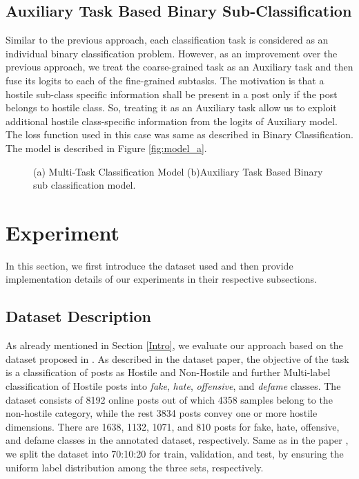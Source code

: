 \documentclass[runningheads]{llncs}
\begin{document}
\subsection{Auxiliary Task Based Binary Sub-Classification}
\label{Aux}
{Similar to the previous approach, each classification task is considered as an individual binary classification problem. However, as an improvement over the previous approach, we treat the coarse-grained task as an Auxiliary task and then fuse its logits to each of the fine-grained subtasks. The motivation is that a hostile sub-class specific information shall be present in a post only if the post belongs to hostile class\cite{Kaushal_2020}. So, treating it as an Auxiliary task allow us to exploit additional hostile class-specific information from the logits of Auxiliary model. The loss function used in this case was same as described in Binary Classification. The model is described in Figure \ref{fig:model_a}.
\begin{figure}[ht]
    \centering
    \hspace{5mm}\caption{(a) Multi-Task Classification Model (b)Auxiliary Task Based Binary sub classification model.}
    \label{fig:model}
\end{figure}
}

\section{Experiment}

In this section, we first introduce the dataset used and then provide implementation details of our experiments in their respective subsections. 

\subsection{Dataset Description}

As already mentioned in Section \ref{Intro}, we evaluate our approach based on the dataset proposed in \cite{bhardwaj2020hostility}. As described in the dataset paper, the objective of the task is a classification of posts as Hostile and Non-Hostile and further Multi-label classification of Hostile posts into \emph{fake}, \emph{hate}, \emph{offensive}, and \emph{defame} classes. The dataset consists of 8192 online posts out of which 4358 samples belong to the non-hostile category, while the rest 3834 posts convey one or more hostile dimensions. There are 1638, 1132, 1071, and 810 posts for fake, hate, offensive, and defame classes in the annotated dataset, respectively. Same as in the paper \cite{bhardwaj2020hostility}, we split the dataset into 70:10:20 for train, validation, and test, by ensuring the uniform label distribution among the three sets, respectively.
\end{document}
